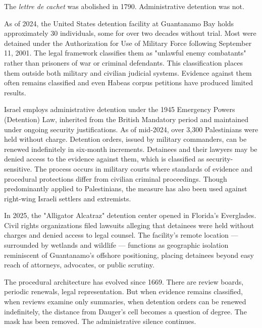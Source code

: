 \begin{commentary}
The \textit{lettre de cachet} was abolished in 1790. Administrative detention was not.

As of 2024, the United States detention facility at Guantanamo Bay holds approximately 30 individuals, some for over two decades without trial. Most were detained under the Authorization for Use of Military Force following September 11, 2001. The legal framework classifies them as "unlawful enemy combatants" rather than prisoners of war or criminal defendants. This classification places them outside both military and civilian judicial systems. Evidence against them often remains classified and even Habeas corpus petitions have produced limited results. 

Israel employs administrative detention under the 1945 Emergency Powers (Detention) Law, inherited from the British Mandatory period and maintained under ongoing security justifications. As of mid-2024, over 3,300 Palestinians were held without charge. Detention orders, issued by military commanders, can be renewed indefinitely in six-month increments. Detainees and their lawyers may be denied access to the evidence against them, which is classified as security-sensitive. The process occurs in military courts where standards of evidence and procedural protections differ from civilian criminal proceedings. Though predominantly applied to Palestinians, the measure has also been used against right-wing Israeli settlers and extremists.

In 2025, the "Alligator Alcatraz" detention center opened in Florida's Everglades. Civil rights organizations filed lawsuits alleging that detainees were held without charges and denied access to legal counsel. The facility's remote location — surrounded by wetlands and wildlife — functions as geographic isolation reminiscent of Guantanamo's offshore positioning, placing detainees beyond easy reach of attorneys, advocates, or public scrutiny.

The procedural architecture has evolved since 1669. There are review boards, periodic renewals, legal representation. But when evidence remains classified, when reviews examine only summaries, when detention orders can be renewed indefinitely, the distance from Dauger's cell becomes a question of degree. The mask has been removed. The administrative silence continues.
\end{commentary}
